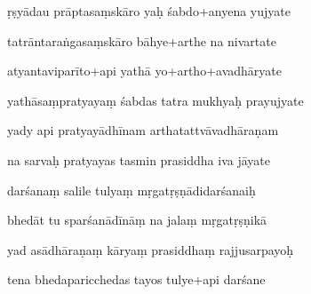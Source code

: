 \documentclass[article,12pt,a4paper]{memoir}%
\newcounter{parCount}
\begin{document}
	  
	  \pstart {} ṛṣyādau prāptasaṃskāro yaḥ śabdo+anyena yujyate 
	{}
	\pend%
      

	  
	  \pstart \leavevmode%
	tatrāntaraṅgasaṃskāro bāhye+arthe na nivartate 
	{}
	\pend%
      

	  
	  \pstart {} atyantaviparīto+api yathā yo+artho+avadhāryate 
	{}
	\pend%
      

	  
	  \pstart \leavevmode%
	yathāsaṃpratyayaṃ śabdas tatra mukhyaḥ prayujyate 
	{}
	\pend%
      

	  
	  \pstart {} yady api pratyayādhīnam arthatattvāvadhāraṇam 
	{}
	\pend%
      

	  
	  \pstart \leavevmode%
	na sarvaḥ pratyayas tasmin prasiddha iva jāyate 
	{}
	\pend%
      

	  
	  \pstart {} darśanaṃ salile tulyaṃ mṛgatṛṣṇādidarśanaiḥ 
	{}
	\pend%
      

	  
	  \pstart \leavevmode%
	bhedāt tu sparśanādīnāṃ na jalaṃ mṛgatṛṣṇikā 
	{}
	\pend%
      

	  
	  \pstart {} yad asādhāraṇaṃ kāryaṃ prasiddhaṃ rajjusarpayoḥ 
	{}
	\pend%
      

	  
	  \pstart \leavevmode%
	tena bhedaparicchedas tayos tulye+api darśane 
	{}
	\pend%
      
\end{document}
